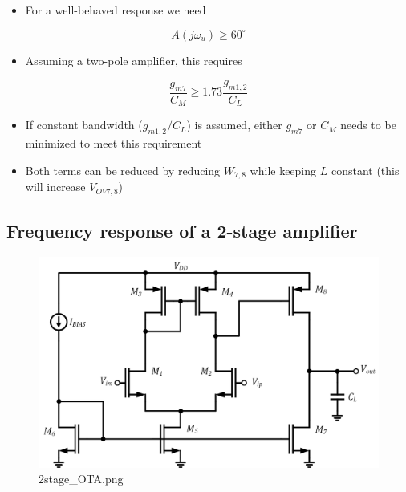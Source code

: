\documentclass[11pt]{article}
\providecommand{\tightlist}{%
      \setlength{\itemsep}{0pt}\setlength{\parskip}{0pt}}
\begin{document}
    \begin{itemize}
\tightlist
\item
  For a well-behaved response we need
\end{itemize}

\begin{equation}
A(j\omega_u) \geq 60^{\circ}
\end{equation}

\begin{itemize}
\tightlist
\item
  Assuming a two-pole amplifier, this requires
\end{itemize}

\begin{equation}
\dfrac{g_{m7}}{C_M} \geq 1.73 \dfrac{g_{m1,2}}{C_L}
\end{equation}

\begin{itemize}
\item
  If constant bandwidth (\(g_{m1,2}/C_L\)) is assumed, either \(g_{m7}\)
  or \(C_M\) needs to be minimized to meet this requirement
\item
  Both terms can be reduced by reducing \(W_{7,8}\) while keeping \(L\)
  constant (this will increase \(V_{OV7,8}\))
\end{itemize}

    \hypertarget{frequency-response-of-a-2-stage-amplifier}{%
\subsection{Frequency response of a 2-stage
amplifier}\label{frequency-response-of-a-2-stage-amplifier}}

    \begin{figure}
\centering
\includegraphics{2stage_OTA.png}
\caption{2stage\_OTA.png}
\end{figure}
\end{document}

